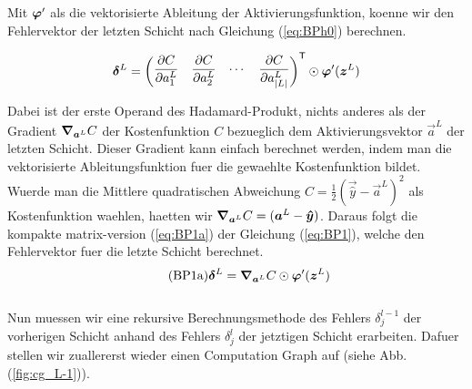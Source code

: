 Mit $\bm{\varphi}'$ als die vektorisierte Ableitung der Aktivierungsfunktion,
koenne wir den Fehlervektor der letzten Schicht nach Gleichung (\ref{eq:BPh0}) berechnen.

\begin{equation}\label{eq:BPh0}
  \bm{\delta}^L = \begin{pmatrix} \displaystyle\frac{\partial C}{\partial a_1^L} & \displaystyle\frac{\partial C}{\partial a_2^L} & \cdots & \displaystyle\frac{\partial C}{\partial a_{|L|}^L}\end{pmatrix}^{\mathsf{T}} \odot \bm{\varphi}'(\bm{z}^L)
\end{equation}

Dabei ist der erste Operand des Hadamard-Produkt, nichts anderes als
der Gradient $\bm{\nabla}_{\bm{a}^L} C$ der Kostenfunktion $C$ bezueglich dem Aktivierungsvektor
$\vec{a}^L$ der letzten Schicht. Dieser Gradient kann einfach berechnet werden, indem man die
vektorisierte Ableitungsfunktion fuer die gewaehlte Kostenfunktion bildet. Wuerde man die
Mittlere quadratischen Abweichung $C = \frac{1}{2}(\vec{\hat{y}} - \vec{a}^L)^2$ als Kostenfunktion waehlen, haetten wir
$\bm{\nabla}_{\bm{a}^L} C = (\bm{a}^L - \bm{\hat{y}})$.
\para{}
Daraus folgt die kompakte matrix-version (\ref{eq:BP1a}) der Gleichung
(\ref{eq:BP1}), welche den Fehlervektor fuer die letzte Schicht berechnet.
\\
\begin{equation}\tag{BP1a}\label{eq:BP1a}
  \bm{\delta}^L = \bm{\nabla}_{\bm{a}^L}C \odot \bm{\varphi}'(\bm{z}^L)
\end{equation}
\\
Nun muessen wir eine rekursive Berechnungsmethode des Fehlers $\delta_j^{l-1}$
der vorherigen Schicht anhand des Fehlers $\delta_j^l$ der jetztigen Schicht
erarbeiten. Dafuer stellen wir zuallererst wieder einen Computation Graph auf
(siehe Abb. (\ref{fig:cg_L-1})).
\para{}
